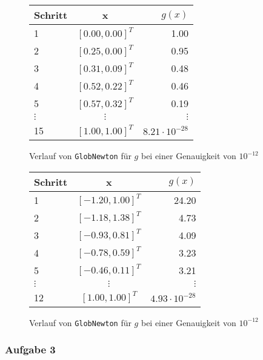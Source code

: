 \documentclass[a4paper, 12pt]{report}
\begin{document}
\begin{figure}[H]
  \centering
  \def\arraystretch{1.25}
  \begin{tabular}{l|c|r}
    \hline
    \textbf{Schritt} & \textbf{x} & \textbf{$g(x)$}\\
    \hline
    1 & $[0.00, 0.00]^T$ & 1.00\\
    2 & $[0.25, 0.00]^T$ & 0.95\\
    3 & $[0.31, 0.09]^T$ & 0.48\\
    4 & $[0.52, 0.22]^T$ & 0.46\\
    5 & $[0.57, 0.32]^T$ & 0.19\\
    $\vdots$ & $\vdots$ & $\vdots$\\
    15 & $[1.00, 1.00]^T$ & $8.21 \cdot 10^{-28}$\\
    \hline
  \end{tabular}
  \caption{Verlauf von \lstinline[basicstyle=\ttfamily\color{black}]|GlobNewton| für $g$ bei einer Genauigkeit von $10^{-12}$}
\end{figure}

\begin{figure}[H]
  \centering
  \def\arraystretch{1.25}
  \begin{tabular}{l|c|r}
    \hline
    \textbf{Schritt} & \textbf{x} & \textbf{$g(x)$}\\
    \hline
    1 & $[-1.20, 1.00]^T$ & 24.20\\
    2 & $[-1.18, 1.38]^T$ & 4.73\\
    3 & $[-0.93, 0.81]^T$ & 4.09\\
    4 & $[-0.78, 0.59]^T$ & 3.23\\
    5 & $[-0.46, 0.11]^T$ & 3.21\\
    $\vdots$ & $\vdots$ & $\vdots$\\
    12 & $[1.00, 1.00]^T$ & $4.93 \cdot 10^{-28}$\\
    \hline
  \end{tabular}
  \caption{Verlauf von \lstinline[basicstyle=\ttfamily\color{black}]|GlobNewton| für $g$ bei einer Genauigkeit von $10^{-12}$}
\end{figure}

\subsubsection{Aufgabe 3}
\end{document}
